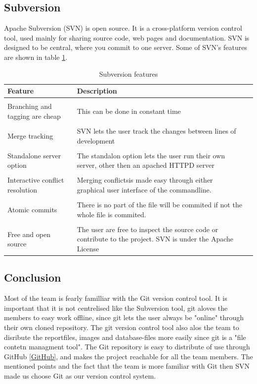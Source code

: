 
\subsection{Subversion}
Apache Subversion (SVN) is open source. It is a cross-platform version control tool, used mainly for sharing source code, web pages and documentation. SVN is designed to be central, where you commit to one server. Some of SVN's features are shown in table \ref{table-subversionfeatures}.

\begin{table}
\centering
\begin{tabularx}{\textwidth}{ l X l }
  \textbf{Feature}      & \textbf{Description} \\
  \hline \\ [-1.5ex]
  Branching and tagging are cheap   & This can be done in constant time \vspace*{0.7ex} \\
  \hline \\ [-1.5ex]
  Merge tracking                    & SVN lets the user track the changes between lines of development \\
  \hline \\ [-1.5ex]
  Standalone server option          & The standalon option lets the user run their own server, other then an apached HTTPD server \\
  \hline \\ [-1.5ex]
  Interactive conflict resolution   & Merging conflictsis made easy through either graphical user interface of the commandline. \\
  \hline \\ [-1.5ex]
  Atomic commits                    & There is no part of the file will be commited if not the whole file is commited. \\
  \hline \\ [-1.5ex]
  Free and open source              & The user are free to inspect the source code or contribute to the project. SVN is under the Apache License \\
\end{tabularx}
\caption{Subversion features}
\label{table-subversionfeatures}
\end{table}


\subsection{Conclusion}
Most of the team is fearly familliar with the Git version control tool. It is important that it is not centrelised like the Subversion tool, git aloves the members to easy work offline, since git lets the user always be "online" through their own cloned repository.
The git version control tool also alos the team to disribute the reportfiles, images and database-files more easily since git is a "file contetn managment tool". 
The Git repository is easy to distribute of use through GitHub \ref{GitHub}, and makes the project reachable for all the team members.
The mentioned points and the fact that the team is more familiar with Git then SVN made us choose Git as our version control system.
